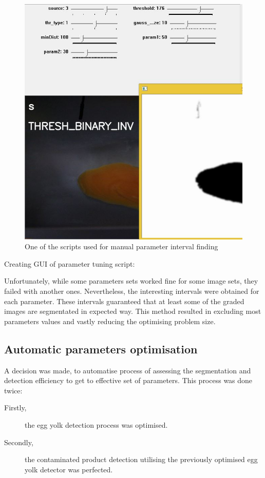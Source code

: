 \documentclass[12pt,twoside,a4paper]{article}
\begin{document}
\begin{figure}[H]
\centering
\includegraphics[width=0.5\paperwidth]{manual}
\caption{One of the scripts used for manual parameter interval finding}\label{fig:manual}
\end{figure}

Creating GUI of parameter tuning script:


Unfortunately, while some parameters sets worked fine for some image sets, they failed with another ones.
Nevertheless, the interesting intervals were obtained for each parameter. These intervals guaranteed that at least some of the graded images are segmentated in expected way.
This method resulted in excluding most parameters values and vastly reducing the optimising problem size.
\newpage
\subsection{Automatic parameters optimisation}

A decision was made, to automatise process of assessing the segmentation and detection efficiency to get to effective set of parameters.
This process was done twice:
\begin{description}
\item[Firstly,] the egg yolk detection process was optimised.
\item[Secondly,] the contaminated product detection utilising the previously optimised egg yolk detector was perfected.
\end{description}
\end{document}
